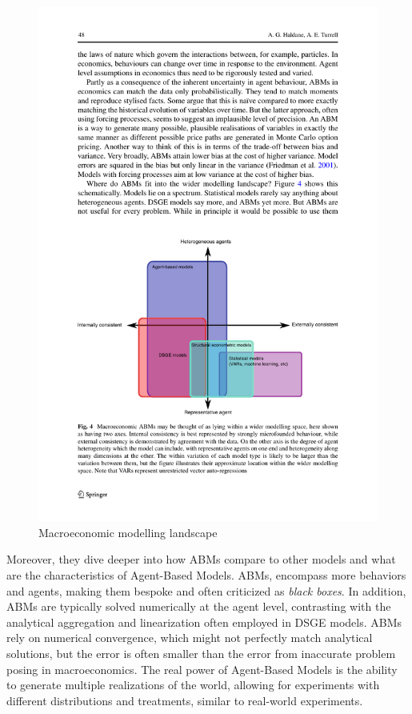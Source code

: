 \documentclass[english]{projectreport}
\begin{document}
\begin{figure}[h]
    \centering
    \includegraphics[width=0.8\linewidth]{ABMinEconomicsModelling.pdf}
    \caption{Macroeconomic modelling landscape}
    \label{fig:macroeconomicModellingLandscape}
\end{figure}

Moreover, they dive deeper into how ABMs compare to other models and what are the characteristics of Agent-Based Models. ABMs, encompass more behaviors and agents, making them bespoke and often criticized as \textit{black boxes}. In addition, ABMs are typically solved numerically at the agent level, contrasting with the analytical aggregation and linearization often employed in DSGE models. ABMs rely on numerical convergence, which might not perfectly match analytical solutions, but the error is often smaller than the error from inaccurate problem posing in macroeconomics. The real power of Agent-Based Models is the ability to generate multiple realizations of the world, allowing for experiments with different distributions and treatments, similar to real-world experiments.
\end{document}
